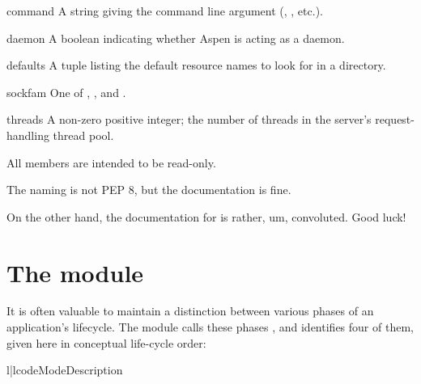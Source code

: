 \begin{memberdesc}[string]{command}
A string giving the command line argument (, , etc.).
\end{memberdesc}

\begin{memberdesc}[boolean]{daemon}
A boolean indicating whether Aspen is acting as a daemon.
\end{memberdesc}

\begin{memberdesc}[tuple]{defaults}
A tuple listing the default resource names to look for in a directory.
\end{memberdesc}

\begin{memberdesc}[int]{sockfam}
One of , , and .
\end{memberdesc}

\begin{memberdesc}[int]{threads}
A non-zero positive integer; the number of threads in the server's
request-handling thread pool.
\end{memberdesc}


All members are intended to be read-only.


\begin{seealso}

{}{The naming is not PEP 8, but the documentation is fine.}

 {}{On
the other hand, the documentation for  is rather, um,
convoluted. Good luck!}

\end{seealso}


\section{The  module}


It is often valuable to maintain a distinction between various phases of an
application's lifecycle. The  module calls these phases
, and identifies four of them, given here in conceptual life-cycle
order:

\begin{tableii}{l|l}{code}{Mode}{Description}
\end{tableii}


